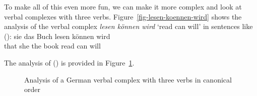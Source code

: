 To make all of this even more fun, we can make it more complex and look at verbal complexes with
three verbs. Figure~\vref{fig-lesen-koennen-wird} shows the analysis of the verbal complex \emph{lesen können wird} `read
can will' in sentences like ():
\ea
\label{ex-lesen-koennen-wird}
\gll [dass] sie das Buch lesen können wird\\
     \spacebr{}that she the book read can will\\
\z

\noindent
The analysis of () is provided in Figure~\ref{fig-lesen-koennen-wird}.
\begin{figure}
\caption{\label{fig-lesen-koennen-wird}Analysis of a German verbal complex with three verbs in canonical order}
\end{figure}

